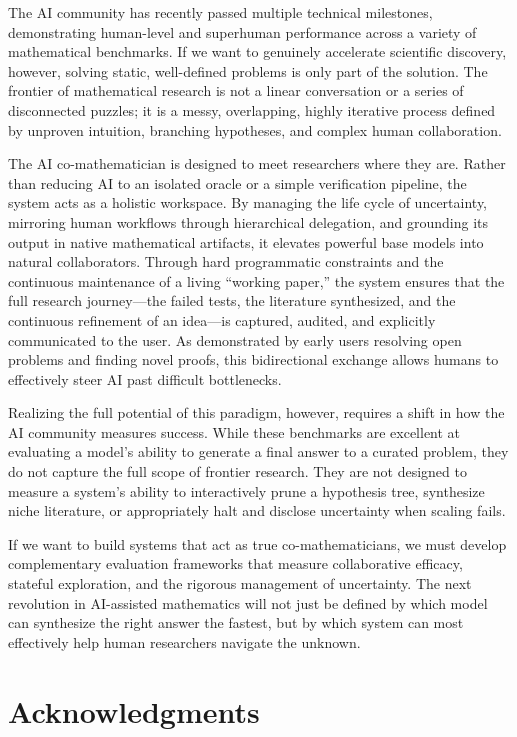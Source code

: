 \documentclass[11pt, a4paper, copyright, gdm]{google}
\begin{document}
The AI community has recently passed multiple technical milestones, demonstrating human-level and superhuman performance across a variety of mathematical benchmarks.
If we want to genuinely accelerate scientific discovery, however, solving static, well-defined problems is only part of the solution.
The frontier of mathematical research is not a linear conversation or a series of disconnected puzzles; it is a messy, overlapping, highly iterative process defined by unproven intuition, branching hypotheses, and complex human collaboration.

The AI co-mathematician is designed to meet researchers where they are.
Rather than reducing AI to an isolated oracle or a simple verification pipeline, the system acts as a holistic workspace.
By managing the life cycle of uncertainty, mirroring human workflows through hierarchical delegation, and grounding its output in native mathematical artifacts, it elevates powerful base models into natural collaborators.
Through hard programmatic constraints and the continuous maintenance of a living ``working paper,'' the system ensures that the full research journey---the failed tests, the literature synthesized, and the continuous refinement of an idea---is captured, audited, and explicitly communicated to the user.
As demonstrated by early users resolving open problems and finding novel proofs, this bidirectional exchange allows humans to effectively steer AI past difficult bottlenecks.

Realizing the full potential of this paradigm, however, requires a shift in how the AI community measures success.
While these benchmarks are excellent at evaluating a model's ability to generate a final answer to a curated problem, they do not capture the full scope of frontier research.
They are not designed to measure a system's ability to interactively prune a hypothesis tree, synthesize niche literature, or appropriately halt and disclose uncertainty when scaling fails.

If we want to build systems that act as true co-mathematicians, we must develop complementary evaluation frameworks that measure collaborative efficacy, stateful exploration, and the rigorous management of uncertainty.
The next revolution in AI-assisted mathematics will not just be defined by which model can synthesize the right answer the fastest, but by which system can most effectively help human researchers navigate the unknown.

\section*{Acknowledgments}
\end{document}
